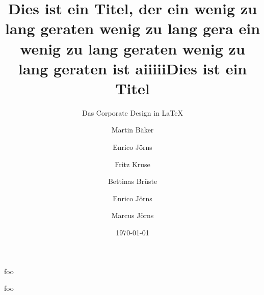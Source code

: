 \documentclass{beamer}
\begin{document}
\subtitle{Das Corporate Design in  LaTeX}
\title{Dies ist ein Titel, der ein wenig zu lang geraten  wenig zu lang gera ein wenig zu lang geraten  wenig zu lang geraten ist aiiiii}%
\title{Dies ist ein Titel}%
\author{Martin Bäker\and Enrico Jörns \and Fritz Kruse \and Bettinas Brüste}%
\author{Enrico Jörns \and Marcus Jörns}
\titlegraphic{\tuDefaultTitlegraphic}
\date{}

\begin{frame}[plain]
  \titlepage
\end{frame}
\date{\today}

\begin{frame}
  foo
\end{frame}

\begin{frame}
  foo
\end{frame}
\end{document}
